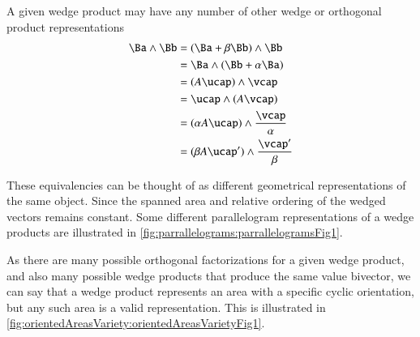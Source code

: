 A given wedge product may have any number of other wedge or orthogonal product representations
\begin{dmath}\label{eqn:wedgeProductArea:1940}
\begin{aligned}
\Ba \wedge \Bb
&= (\Ba + \beta \Bb ) \wedge \Bb \\
&= \Ba \wedge ( \Bb + \alpha \Ba ) \\
&= (A \ucap) \wedge \vcap \\
&= \ucap \wedge (A \vcap) \\
&= (\alpha A \ucap) \wedge \frac{\vcap}{\alpha} \\
&= (\beta A \ucap') \wedge \frac{\vcap'}{\beta} \\
\end{aligned}
\end{dmath}

These equivalencies can be thought of as different geometrical representations of the same object. Since the spanned area and relative ordering of the wedged vectors remains constant.
Some different parallelogram representations of a wedge products are illustrated in \cref{fig:parrallelograms:parrallelogramsFig1}.


As there are many possible orthogonal factorizations for a given wedge product, and also many possible wedge products that produce the same value bivector,
we can say that a wedge product represents an area with a specific cyclic orientation, but any such area is a valid representation.
This is illustrated in \cref{fig:orientedAreasVariety:orientedAreasVarietyFig1}.


